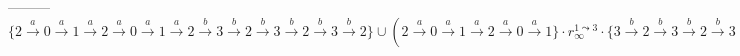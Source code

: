 {---------$\{2 \xrightarrow{a} 0 \xrightarrow{a} 1 \xrightarrow{a} 2 \xrightarrow{a} 0 \xrightarrow{a} 1 \xrightarrow{a} 2 \xrightarrow{b} 3 \xrightarrow{b} 2 \xrightarrow{b} 3 \xrightarrow{b} 2 \xrightarrow{b} 3 \xrightarrow{b} 2\} \cup (2 \xrightarrow{a}  0 \xrightarrow{a} 1 \xrightarrow{a} 2 \xrightarrow{a} 0 \xrightarrow{a} 1\} \cdot r_\infty^{1\leadsto 3} \cdot \{3 \xrightarrow{b} 2 \xrightarrow{b} 3 \xrightarrow{b} 2 \xrightarrow{b} 3 \xrightarrow{b} 2\}))$\\

}
